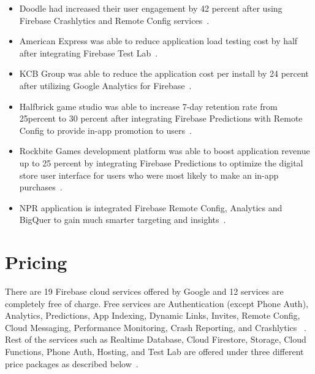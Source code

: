 \begin{itemize} \item Doodle had increased their user engagement by 42 percent
	after using Firebase Crashlytics and Remote Config
	services~\cite{hid-sp18-409-www-doodle, hid-sp18-409-www-firebase-usecases}.
	
	\item American Express was able to reduce application load testing cost by 
	half
	after integrating Firebase Test Lab~\cite{hid-sp18-409-www-americanexpress}.
	
	\item KCB Group was able to reduce the application cost per install by 24
	percent after utilizing Google Analytics for
	Firebase~\cite{hid-sp18-409-www-kcbgroup, 
	hid-sp18-409-www-firebase-usecases}.
	
	\item Halfbrick game studio was able to increase 7-day retention rate from
	25percent to 30 percent after integrating Firebase Predictions with Remote
	Config to provide in-app promotion to 
	users~\cite{hid-sp18-409-www-halfbrick,
		hid-sp18-409-www-firebase-usecases}.
	
	\item Rockbite Games development platform was able to boost application 
	revenue
	up to 25 percent by integrating Firebase Predictions to optimize the digital
	store user interface for users who were most likely to make an in-app
	purchases~\cite{hid-sp18-409-www-rockbitegames}.
	
	\item NPR application is integrated Firebase Remote Config, Analytics and
	BigQuer to gain much smarter targeting and
	insights~\cite{hid-sp18-409-www-firebase-usecases}. \end{itemize}

\section{Pricing} There are 19 Firebase cloud services offered by Google and 12
services are completely free of charge. Free services are Authentication (except
Phone Auth), Analytics, Predictions, App Indexing, Dynamic Links, Invites,
Remote Config, Cloud Messaging, Performance Monitoring, Crash Reporting, and
Crashlytics ~\cite{hid-sp18-409-www-firebase-pricing}. Rest of the services such
as Realtime Database, Cloud Firestore, Storage, Cloud Functions, Phone Auth,
Hosting, and Test Lab are offered under three different price packages as
described below~\cite{hid-sp18-409-www-firebase-pricing}.

